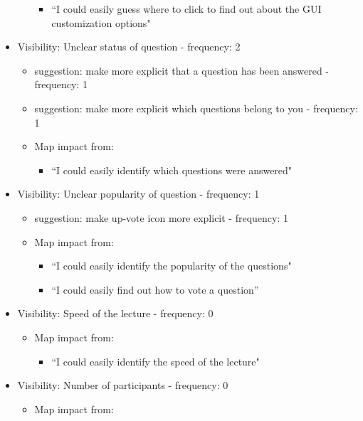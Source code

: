 \documentclass{article}
\begin{document}
\begin{itemize}
\begin{itemize}
        \begin{itemize}
            \item ``I could easily guess where to click to find out about the GUI customization options"
        \end{itemize}
    \end{itemize}
    \item Visibility: Unclear status of question - frequency: 2
    \begin{itemize}
        \item suggestion: make more explicit that a question has been answered - frequency: 1
        \item suggestion: make more explicit which questions belong to you - frequency: 1
        \item Map impact from:
        \begin{itemize}
            \item ``I could easily identify which questions were answered"
        \end{itemize}
    \end{itemize}
    \item Visibility: Unclear popularity of question - frequency: 1
    \begin{itemize}
        \item suggestion: make up-vote icon more explicit - frequency: 1
        \item Map impact from:
        \begin{itemize}
            \item ``I could easily identify the popularity of the questions"
            \item ``I could easily find out how to vote a question''
        \end{itemize}
    \end{itemize}
    \item Visibility: Speed of the lecture - frequency: 0
    \begin{itemize}
        \item Map impact from:
        \begin{itemize}
            \item ``I could easily identify the speed of the lecture"
        \end{itemize}
    \end{itemize}
    \item Visibility: Number of participants - frequency: 0
    \begin{itemize}
        \item Map impact from:

\end{itemize}
\end{itemize}
\end{document}
